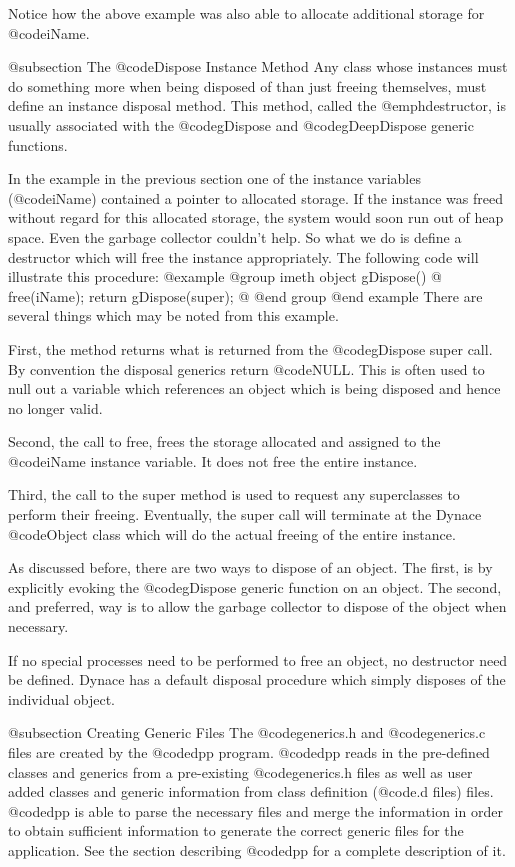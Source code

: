 Notice how the above example was also able to allocate additional storage
for @code{iName}.


@subsection The @code{Dispose} Instance Method
Any class whose instances must do something more when being disposed of
than just freeing themselves, must define an instance disposal method.
This method, called the @emph{destructor}, is usually associated with
the @code{gDispose} and @code{gDeepDispose} generic functions.

In the example in the previous section one of the instance variables
(@code{iName}) contained a pointer to allocated storage.  If the instance
was freed without regard for this allocated storage, the system would
soon run out of heap space.  Even the garbage collector couldn't help.
So what we do is define a destructor which will free the instance
appropriately.  The following code will illustrate this procedure:
@example
@group
imeth   object    gDispose()
@{
        free(iName);
        return gDispose(super);
@}
@end group
@end example
There are several things which may be noted from this example.

First, the method returns what is returned from the @code{gDispose}
super call.   By convention the disposal generics return @code{NULL}.
This is often used to null out a variable which references an object
which is being disposed and hence no longer valid.

Second, the call to free, frees the storage allocated and assigned to
the @code{iName} instance variable.  It does not free the entire
instance.

Third, the call to the super method is used to request any
superclasses to perform their freeing.  Eventually, the super call will
terminate at the Dynace @code{Object} class which will do the actual
freeing of the entire instance.

As discussed before, there are two ways to dispose of an object.  The
first, is by explicitly evoking the @code{gDispose} generic function on
an object.  The second, and preferred, way is to allow the garbage
collector to dispose of the object when necessary.

If no special processes need to be performed to free an object, no
destructor need be defined.  Dynace has a default disposal procedure
which simply disposes of the individual object.


@subsection Creating Generic Files
The @code{generics.h} and @code{generics.c} files are created by the
@code{dpp} program.  @code{dpp} reads in the pre-defined classes and
generics from a pre-existing @code{generics.h} files as well as user
added classes and generic information from class definition (@code{.d}
files) files.  @code{dpp} is able to parse the necessary files and merge
the information in order to obtain sufficient information to generate
the correct generic files for the application.   See the section describing
@code{dpp} for a complete description of it.


